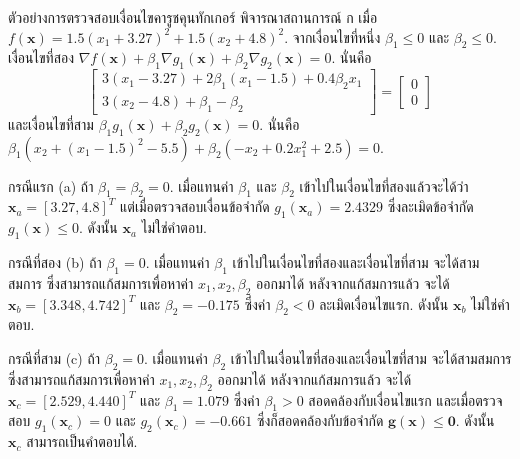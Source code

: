 \begin{Exercise}
ตัวอย่างการตรวจสอบเงื่อนไขคารูชคุนทักเกอร์ 
พิจารณาสถานการณ์ ก เมื่อ $f(\bm{x}) = 1.5 (x_1 + 3.27)^2 + 1.5 (x_2 + 4.8)^2$.
%
จากเงื่อนไขที่หนึ่ง $\beta_1 \leq 0$ และ $\beta_2 \leq 0$.
เงื่อนไขที่สอง $\nabla f(\bm{x}) + \beta_1 \nabla g_1(\bm{x}) + \beta_2 \nabla g_2(\bm{x}) = 0$.
นั่นคือ
\[
\begin{bmatrix}
3(x_1 - 3.27) + 2 \beta_1 (x_1 - 1.5) + 0.4 \beta_2 x_1 \\
3(x_2 - 4.8) + \beta_1 - \beta_2 
\end{bmatrix}
= 
\begin{bmatrix}
0 \\
0
\end{bmatrix}
\]
และเงื่อนไขที่สาม $\beta_1 g_1(\bm{x}) + \beta_2 g_2(\bm{x}) = 0$.
นั่นคือ
$\beta_1 (x_2 + (x_1 - 1.5)^2 - 5.5) + \beta_2 (-x_2 + 0.2 x_1^2 + 2.5) = 0$.

กรณีแรก (a) ถ้า $\beta_1 = \beta_2 =0$.
เมื่อแทนค่า $\beta_1$ และ $\beta_2$ เข้าไปในเงื่อนไขที่สองแล้วจะได้ว่า
$\bm{x}_a = [3.27, 4.8]^T$
แต่เมื่อตรวจสอบเงื่อนข้อจำกัด $g_1(\bm{x}_a) = 2.4329$ ซึ่งละเมิดข้อจำกัด $g_1(\bm{x}) \leq 0$.
ดังนั้น $\bm{x}_a$ ไม่ใช่คำตอบ.

กรณีที่สอง (b) ถ้า $\beta_1 = 0$.
เมื่อแทนค่า $\beta_1$ เข้าไปในเงื่อนไขที่สองและเงื่อนไขที่สาม จะได้สามสมการ ซึ่งสามารถแก้สมการเพื่อหาค่า $x_1, x_2, \beta_2$ ออกมาได้
หลังจากแก้สมการแล้ว จะได้
$\bm{x}_b = [3.348, 4.742]^T$ และ $\beta_2 = -0.175$
%
ซึ่งค่า $\beta_2 < 0$ ละเมิดเงื่อนไขแรก.
ดังนั้น $\bm{x}_b$ ไม่ใช่คำตอบ.

กรณีที่สาม (c) ถ้า $\beta_2 = 0$.
เมื่อแทนค่า $\beta_2$ เข้าไปในเงื่อนไขที่สองและเงื่อนไขที่สาม จะได้สามสมการ ซึ่งสามารถแก้สมการเพื่อหาค่า $x_1, x_2, \beta_2$ ออกมาได้
หลังจากแก้สมการแล้ว จะได้
$\bm{x}_c = [2.529, 4.440]^T$ และ $\beta_1 = 1.079$
%
ซึ่งค่า $\beta_1 > 0$ สอดคล้องกับเงื่อนไขแรก
และเมื่อตรวจสอบ $g_1(\bm{x}_c) = 0$ และ $g_2(\bm{x}_c) = -0.661$ ซึ่งก็สอดคล้องกับข้อจำกัด $\bm{g}(\bm{x}) \leq \bm{0}$.
ดังนั้น $\bm{x}_c$ สามารถเป็นคำตอบได้.


\end{Exercise}

